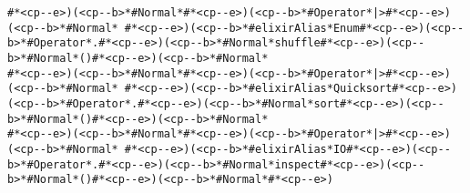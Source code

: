 \begin{lstlisting}[style=carbonpaper]
#*<cp--e>)(<cp--b>*#Normal*#*<cp--e>)(<cp--b>*#Operator*|>#*<cp--e>)(<cp--b>*#Normal* #*<cp--e>)(<cp--b>*#elixirAlias*Enum#*<cp--e>)(<cp--b>*#Operator*.#*<cp--e>)(<cp--b>*#Normal*shuffle#*<cp--e>)(<cp--b>*#Normal*()#*<cp--e>)(<cp--b>*#Normal*
#*<cp--e>)(<cp--b>*#Normal*#*<cp--e>)(<cp--b>*#Operator*|>#*<cp--e>)(<cp--b>*#Normal* #*<cp--e>)(<cp--b>*#elixirAlias*Quicksort#*<cp--e>)(<cp--b>*#Operator*.#*<cp--e>)(<cp--b>*#Normal*sort#*<cp--e>)(<cp--b>*#Normal*()#*<cp--e>)(<cp--b>*#Normal*
#*<cp--e>)(<cp--b>*#Normal*#*<cp--e>)(<cp--b>*#Operator*|>#*<cp--e>)(<cp--b>*#Normal* #*<cp--e>)(<cp--b>*#elixirAlias*IO#*<cp--e>)(<cp--b>*#Operator*.#*<cp--e>)(<cp--b>*#Normal*inspect#*<cp--e>)(<cp--b>*#Normal*()#*<cp--e>)(<cp--b>*#Normal*#*<cp--e>)
\end{lstlisting}
